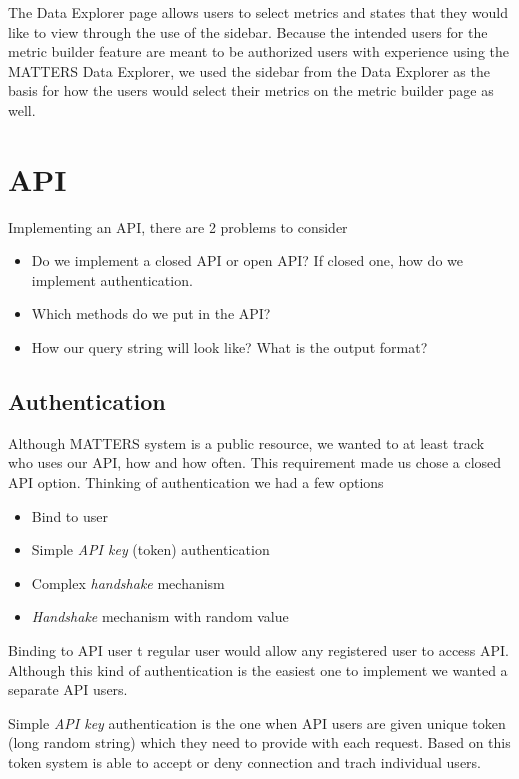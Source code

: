 	The Data Explorer page allows users to select metrics and states that they would like to view through the use of the sidebar. Because the intended users for the metric builder feature are meant to be authorized users with experience using the MATTERS Data Explorer, we used the sidebar from the Data Explorer as the basis for how the users would select their metrics on the metric builder page as well.  
	

\section{API}
		
		Implementing an API, there are 2 problems to consider
		\begin{itemize}
			\item
				Do we implement a closed API or open API? If closed one, how do we implement authentication.
			\item
				Which methods do we put in the API?
			\item
				How our query string will look like? What is the output format?
		\end{itemize}
		
		\subsection{Authentication}
			
			Although MATTERS system is a public resource, we wanted to at least track who uses our API, how and how often. This requirement made us chose a closed API option. Thinking of authentication we had a few options
			\begin{itemize}
				\item
					Bind to user
				\item
					Simple \emph{API key} (token) authentication
				\item
					Complex \emph{handshake} mechanism					
				\item
					\emph{Handshake} mechanism with random value
			\end{itemize}
			
			Binding to API user t regular user would allow any registered user to access API. Although this kind of authentication is the easiest one to implement we wanted a separate API users.
			
			Simple  \emph{API key} authentication is the one when API users are given unique token (long random string) which they need to provide with each request. Based on this token system is able to accept or deny connection and trach individual users.
			
